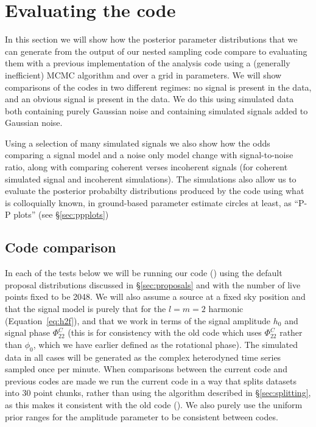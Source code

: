 \section{Evaluating the code}

In this section we will show how the posterior parameter distributions that we can generate from the output
of our nested sampling code compare to evaluating them with a previous implementation of the analysis code
\citep[\lppe used in e.g.][]{2014ApJ...785..119A} using a (generally inefficient) MCMC algorithm and over a grid in parameters.
We will show comparisons of the codes in two different regimes: no signal is present in the data, and an obvious signal is
present in the data. We do this using simulated data both containing purely Gaussian noise and containing simulated signals
added to Gaussian noise.

Using a selection of many simulated signals we also show how the odds comparing a signal model and a noise only model change with
signal-to-noise ratio, along with comparing coherent verses incoherent signals (for coherent simulated signal and incoherent simulations).
The simulations also allow us to evaluate the posterior probabilty distributions produced by the code using what is colloquially known,
in ground-based \gw parameter estimate circles at least, as ``P-P plots'' (see \S\ref{sec:ppplots})

\subsection{Code comparison}

In each of the tests below we will be running our code (\lppen) using the default proposal distributions discussed in \S\ref{sec:proposals}
and with the number of live points fixed to be 2048. We will also assume a source at a fixed sky position and that the signal model is purely
that for the $l=m=2$ harmonic (Equation~\ref{eq:h2f}), and that we work in terms of the signal amplitude $h_0$ and signal phase
$\Phi_{22}^C$ (this is for consistency with the old code which uses $\Phi_{22}^C$ rather than $\phi_0$, which we have earlier defined as the
rotational phase). The simulated data in all cases 
will be generated as the complex heterodyned
time series sampled once per minute. When comparisons between the current code and previous codes are 
made we run the current code in a way that splits datasets into 30 point chunks, rather than using the algorithm described in \S\ref{sec:splitting},
as this makes it consistent with the old code (\lppe). We also purely use the uniform prior ranges for the amplitude parameter to be
consistent between codes.

